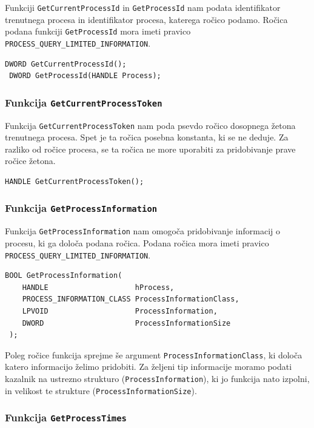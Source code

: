 \documentclass[a4paper,12pt,openright]{book}
\begin{document}
Funkciji \texttt{GetCurrentProcessId} in \texttt{GetProcessId} nam podata identifikator trenutnega procesa in identifikator procesa, katerega ročico podamo.
Ročica podana funkciji \texttt{GetProcessId} mora imeti pravico \texttt{PROCESS\_QUERY\_LIMITED\-\_INFORMATION}.

\begin{lstlisting}[style=func]
 DWORD GetCurrentProcessId();
 DWORD GetProcessId(HANDLE Process);
\end{lstlisting}

\subsubsection{Funkcija \texttt{GetCurrentProcessToken}}

Funkcija \texttt{GetCurrentProcessToken} nam poda psevdo ročico dosopnega žetona trenutnega procesa.
Spet je ta ročica posebna konstanta, ki se ne deduje.
Za razliko od ročice procesa, se ta ročica ne more uporabiti za pridobivanje prave ročice žetona.

\begin{lstlisting}[style=func]
 HANDLE GetCurrentProcessToken();
\end{lstlisting}

\subsubsection{Funkcija \texttt{GetProcessInformation}}

Funkcija \texttt{GetProcessInformation} nam omogoča pridobivanje informacij o procesu, ki ga določa podana ročica.
Podana ročica mora imeti pravico \texttt{PROCESS\_QUERY\_LIMITED\_INFORMATION}.

\begin{lstlisting}[style=func]
 BOOL GetProcessInformation(
	HANDLE                    hProcess,
	PROCESS_INFORMATION_CLASS ProcessInformationClass,
	LPVOID                    ProcessInformation,
	DWORD                     ProcessInformationSize
 );
\end{lstlisting}

Poleg ročice funkcija sprejme še argument \texttt{ProcessInformationClass}, ki določa katero informacijo želimo pridobiti.
Za željeni tip informacije moramo podati kazalnik na ustrezno strukturo (\texttt{ProcessInformation}), ki jo funkcija nato izpolni, in velikost te strukture (\texttt{ProcessInformationSize}).

\subsubsection{Funkcija \texttt{GetProcessTimes}}
\end{document}
